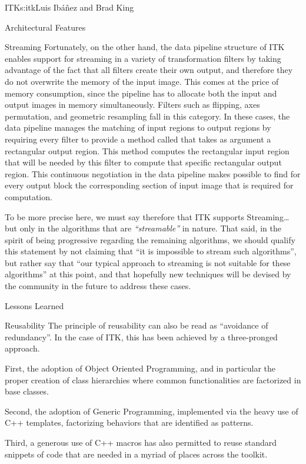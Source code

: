 \begin{aosachapter}{ITK}{s:itk}{Luis Ib\'{a}\~{n}ez and Brad King}
\begin{aosasect1}{Architectural Features}
\begin{aosasect2}{Streaming}
Fortunately, on the other hand, the data pipeline structure of ITK enables
support for streaming in a variety of transformation filters by taking
advantage of the fact that all filters create their own output, and therefore
they do not overwrite the memory of the input image. This comes at the price of
memory consumption, since the pipeline has to allocate both the input and
output images in memory simultaneously. Filters such as flipping, axes
permutation, and geometric resampling fall in this category. In these cases,
the data pipeline manages the matching of input regions to output regions by
requiring every filter to provide a method called
 that takes as argument a rectangular
output region. This method computes the rectangular input region that will be
needed by this filter to compute that specific rectangular output region. This
continuous negotiation in the data pipeline makes possible to find for every
output block the corresponding section of input image that is required for
computation.

To be more precise here, we must say therefore that ITK supports
Streaming\ldots but only in the algorithms that are \emph{``streamable''} in
nature. That said, in the spirit of being progressive regarding the remaining
algorithms, we should qualify this statement by not claiming that ``it is
impossible to stream such algorithms'', but rather say that ``our typical
approach to streaming is not suitable for these algorithms'' at this point, and
that hopefully new techniques will be devised by the community in the future to
address these cases.
\end{aosasect2}

\end{aosasect1}

\begin{aosasect1}{Lessons Learned}

\begin{aosasect2}{Reusability}
The principle of reusability can also be read as ``avoidance of redundancy''.
In the case of ITK, this has been achieved by a three-pronged approach.

\begin{aosaitemize}
\item First, the adoption of Object Oriented Programming, and in particular the
proper creation of class hierarchies where common functionalities are
factorized in base classes.
\item Second, the adoption of Generic Programming, implemented via the heavy
use of C++ templates, factorizing behaviors that are identified as patterns.
\item Third, a generous use of C++ macros has also permitted to reuse standard
snippets of code that are needed in a myriad of places across the toolkit.
\end{aosaitemize}


\end{aosasect2}
\end{aosasect1}
\end{aosachapter}
